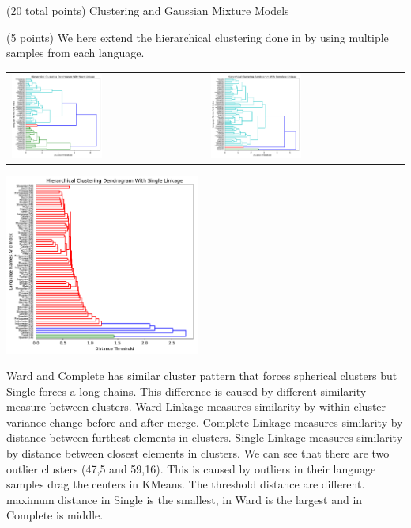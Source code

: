 \documentclass[12pt]{article}
\begin{document}
\begin{question}{(20 total points) Clustering and Gaussian Mixture Models}
\begin{subquestion}{(5 points)
       We here extend the hierarchical clustering done in  by
       using multiple samples from each language.
     }
\begin{answerbox}{50em}
         \begin{tabular}{ ll }
         \includegraphics [width=0.48\textwidth]{Cluster-ward.pdf}
         &
         \includegraphics [width=0.48\textwidth]{Cluster-complete.pdf} \end{tabular}
         \begin{center}
         \includegraphics[width=0.48\textwidth]{Cluster-single.pdf}
         \end{center}
      Ward and Complete has similar cluster pattern that forces spherical clusters but Single forces a long chains. This difference is caused by different similarity measure between clusters. Ward Linkage measures similarity by within-cluster variance change before and after merge. Complete Linkage measures similarity by distance between furthest elements in clusters. Single Linkage measures similarity by distance between closest elements in clusters. We can see that there are two outlier clusters (47,5 and 59,16). This is caused by outliers in their language samples drag the centers in KMeans. The threshold distance are different. maximum distance in Single is the smallest, in Ward is the largest and in Complete is middle. 

\end{answerbox}
\end{subquestion}
\end{question}
\end{document}
